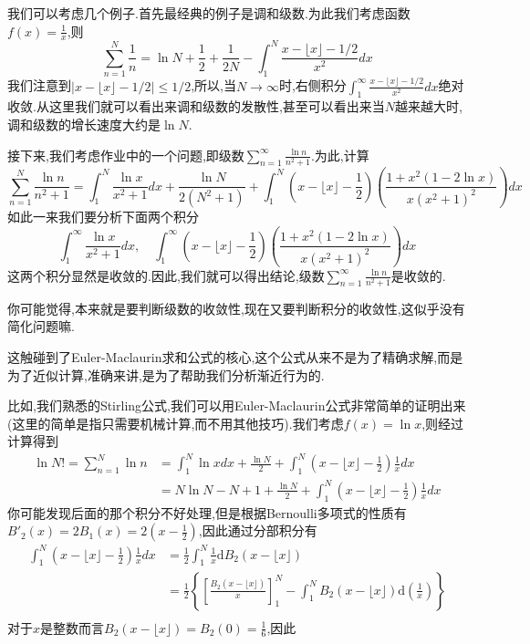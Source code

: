 \documentclass[a4paper,UTF8,12pt]{ctexart}
\begin{document}
我们可以考虑几个例子.首先最经典的例子是调和级数.为此我们考虑函数$f(x)=\frac{1}{x}$,则
$$
\sum_{n=1}^{N}\frac{1}{n} = \ln N+\frac{1}{2}+\frac{1}{2N}-\int_{1}^{N}\frac{x-\lfloor x \rfloor-1/2}{x^2}dx
$$
我们注意到$|x-\lfloor x \rfloor-1/2| \leqslant 1/2$,所以,当$N\to\infty$时,右侧积分$\int_{1}^{\infty}\frac{x-\lfloor x \rfloor-1/2}{x^2}dx$绝对收敛.从这里我们就可以看出来调和级数的发散性,甚至可以看出来当$N$越来越大时,调和级数的增长速度大约是$\ln N$.\par
接下来,我们考虑作业中的一个问题,即级数$\sum_{n=1}^{\infty}\frac{\ln n}{n^2+1}$.为此,计算
$$
\sum_{n=1}^{N}\frac{\ln n}{n^2+1} = \int_{1}^{N}\frac{\ln x}{x^2+1}dx+\frac{\ln N}{2(N^2+1)}+\int_{1}^{N}(x-\lfloor x \rfloor-\frac{1}{2})\left(\frac{1+x^2(1-2\ln x)}{x(x^2+1)^2}\right)dx
$$
如此一来我们要分析下面两个积分
$$
\int_{1}^{\infty}\frac{\ln x}{x^2+1}dx,\quad \int_{1}^{\infty}(x-\lfloor x \rfloor-\frac{1}{2})\left(\frac{1+x^2(1-2\ln x)}{x(x^2+1)^2}\right)dx
$$
这两个积分显然是收敛的.因此,我们就可以得出结论,级数$\sum_{n=1}^{\infty}\frac{\ln n}{n^2+1}$是收敛的.\par
你可能觉得,本来就是要判断级数的收敛性,现在又要判断积分的收敛性,这似乎没有简化问题嘛.\par
这触碰到了Euler-Maclaurin求和公式的核心,这个公式从来不是为了精确求解,而是为了近似计算,准确来讲,是为了帮助我们分析渐近行为的.\par
比如,我们熟悉的Stirling公式,我们可以用Euler-Maclaurin公式非常简单的证明出来(这里的简单是指只需要机械计算,而不用其他技巧).我们考虑$f(x)=\ln x$,则经过计算得到
$$
\begin{aligned}
    \ln N! = \sum_{n=1}^{N}\ln n &= \int_{1}^{N}\ln x dx + \frac{\ln N}{2} + \int_{1}^{N}(x-\lfloor x \rfloor-\frac{1}{2})\frac{1}{x}dx\\
        &= N\ln N - N + 1 + \frac{\ln N}{2} + \int_{1}^{N}(x-\lfloor x \rfloor-\frac{1}{2})\frac{1}{x}dx
\end{aligned}
$$
你可能发现后面的那个积分不好处理,但是根据Bernoulli多项式的性质有$B'_2(x)=2B_1(x)=2(x-\frac{1}{2})$,因此通过分部积分有
$$
\begin{aligned}
    \int_{1}^{N}(x-\lfloor x \rfloor-\frac{1}{2})\frac{1}{x}dx &= \frac{1}{2}\int_1^N \frac{1}{x}\mathrm{d}B_2(x-\lfloor x \rfloor) \\
    &= \frac{1}{2}\left\{\left[\frac{B_2(x-\lfloor x \rfloor)}{x}\right]_{1}^{N}-\int_1^N B_2(x-\lfloor x \rfloor)\mathrm{d}\left(\frac{1}{x}\right)\right\} \\
\end{aligned}
$$
对于$x$是整数而言$B_2(x-\lfloor x \rfloor)=B_2(0)=\frac{1}{6}$,因此
\end{document}

